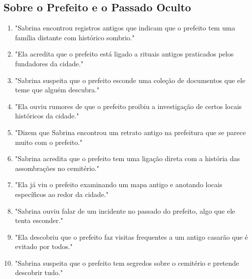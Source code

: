 \subsection*{Sobre o Prefeito e o Passado Oculto}
\begin{enumerate}
    \item "Sabrina encontrou registros antigos que indicam que o prefeito tem uma família distante com histórico sombrio."
    \item "Ela acredita que o prefeito está ligado a rituais antigos praticados pelos fundadores da cidade."
    \item "Sabrina suspeita que o prefeito esconde uma coleção de documentos que ele teme que alguém descubra."
    \item "Ela ouviu rumores de que o prefeito proibiu a investigação de certos locais históricos da cidade."
    \item "Dizem que Sabrina encontrou um retrato antigo na prefeitura que se parece muito com o prefeito."
    \item "Sabrina acredita que o prefeito tem uma ligação direta com a história das assombrações no cemitério."
    \item "Ela já viu o prefeito examinando um mapa antigo e anotando locais específicos ao redor da cidade."
    \item "Sabrina ouviu falar de um incidente no passado do prefeito, algo que ele tenta esconder."
    \item "Ela descobriu que o prefeito faz visitas frequentes a um antigo casarão que é evitado por todos."
    \item "Sabrina suspeita que o prefeito tem segredos sobre o cemitério e pretende descobrir tudo."
\end{enumerate}

